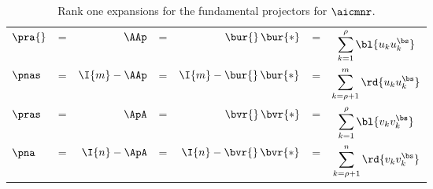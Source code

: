 \begin{table}[htdp]
\caption[Rank one expansions for the fundamental projectors]{Rank one expansions for the fundamental projectors for $\aicmnr$.}
\begin{center}
\begin{tabular}{lcrcrcc}
%
%
  $\pra{}$ & = & $\AAp$         & = & $\bur{} \,\bur{*}$         & = & $\displaystyle\sum_{k=1}^{\rho} {\bl{ u_{k}u_{k}^{\bs} }}$ \\
%
  $\pnas$  & = & $\I{m} - \AAp$ & = & $\I{m} - \bur{} \,\bur{*}$ & = & $\displaystyle\sum_{k=\rho+1}^{m} {\rd{ u_{k}u_{k}^{\bs} }}$ \\
%
  $\pras$  & = & $\ApA$         & = & $\bvr{} \,\bvr{*}$         & = & $\displaystyle\sum_{k=1}^{\rho} {\bl{ v_{k}v_{k}^{\bs} }}$ \\   
%
  $\pna$   & = & $\I{n} - \ApA$ & = & $\I{n} - \bvr{} \,\bvr{*}$ & = & $\displaystyle\sum_{k=\rho+1}^{n} {\rd{ v_{k}v_{k}^{\bs} }}$ \\
%
\end{tabular}
\end{center}
\label{tab:projectors:rank one}
\end{table}

\endinput